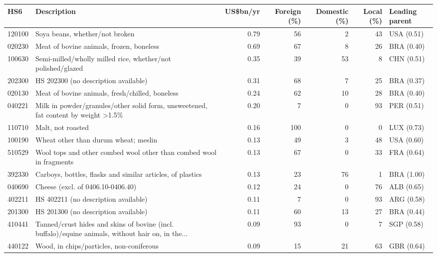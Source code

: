 \begin{tabular}{@{}l p{6.4cm} r r r r l@{}}
\toprule
HS6 & Description & US\$bn/yr & Foreign (\%) & Domestic (\%) & Local (\%) & Leading parent \\
\midrule
120100 & Soya beans, whether/\allowbreak{}not broken & 0.79 & 56 & 2 & 43 & USA (0.51) \\
020230 & Meat of bovine animals, frozen, boneless & 0.69 & 67 & 8 & 26 & BRA (0.40) \\
100630 & Semi-milled/\allowbreak{}wholly milled rice, whether/\allowbreak{}not polished/\allowbreak{}glazed & 0.35 & 39 & 53 & 8 & CHN (0.51) \\
202300 & HS 202300 (no description available) & 0.31 & 68 & 7 & 25 & BRA (0.37) \\
020130 & Meat of bovine animals, fresh/\allowbreak{}chilled, boneless & 0.24 & 62 & 10 & 28 & BRA (0.40) \\
040221 & Milk in powder/\allowbreak{}granules/\allowbreak{}other solid form, unsweetened, fat content by weight >1.5\% & 0.20 & 7 & 0 & 93 & PER (0.51) \\
110710 & Malt, not roasted & 0.16 & 100 & 0 & 0 & LUX (0.73) \\
100190 & Wheat other than durum wheat; meslin & 0.13 & 49 & 3 & 48 & USA (0.60) \\
510529 & Wool tops and other combed wool other than combed wool in fragments & 0.13 & 67 & 0 & 33 & FRA (0.64) \\
392330 & Carboys, bottles, flasks and similar articles, of plastics & 0.13 & 23 & 76 & 1 & BRA (1.00) \\
040690 & Cheese (excl. of 0406.10-0406.40) & 0.12 & 24 & 0 & 76 & ALB (0.65) \\
402211 & HS 402211 (no description available) & 0.11 & 7 & 0 & 93 & ARG (0.58) \\
201300 & HS 201300 (no description available) & 0.11 & 60 & 13 & 27 & BRA (0.44) \\
410441 & Tanned/\allowbreak{}crust hides and skins of bovine (incl. buffalo)/\allowbreak{}equine animals, without hair on, in the... & 0.09 & 93 & 0 & 7 & SGP (0.58) \\
440122 & Wood, in chips/\allowbreak{}particles, non-coniferous & 0.09 & 15 & 21 & 63 & GBR (0.64) \\
\bottomrule
\end{tabular}
